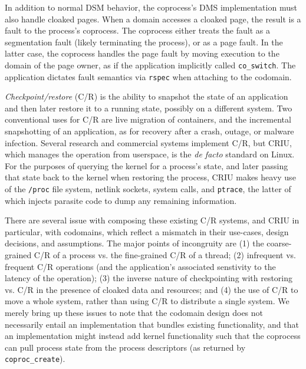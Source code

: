 In addition to normal DSM behavior, the coprocess's DMS implementation must
also handle cloaked pages.
%
When a domain accesses a cloaked page, the result is a fault to the process's
coprocess.
%
The coprocess either treats the fault as a segmentation fault (likely
terminating the process), or as a page fault.
%
In the latter case, the coprocess handles the page fault by moving execution to
the domain of the page owner, as if the application implicitly called
\texttt{co\_switch}.
%
The application dictates fault semantics via \texttt{rspec}
when attaching to the codomain.


%
\emph{Checkpoint/restore} (C/R) is the ability to snapshot the state of an
application and then later restore it to a running state, possibly
on a different system.
%
Two conventional uses for C/R are live migration of containers,
and the incremental snapshotting of an application, as for recovery
after a crash, outage, or malware infection.
%
Several research and commercial systems implement C/R, but CRIU, which manages
the operation from userspace, is the \emph{de facto} standard on Linux.
%
For the purposes of querying the kernel for a process's state, and later
passing that state back to the kernel when restoring the process,
CRIU makes heavy use of the \texttt{/proc} file system, netlink sockets,
system calls, and \texttt{ptrace}, the latter of which injects parasite code
to dump any remaining information.


There are several issue with composing these existing C/R systems, and CRIU in
particular, with codomains, which reflect a mismatch in their use-cases, design
decisions, and assumptions.
%
The major points of incongruity are (1) the coarse-grained C/R of a process vs.
the fine-grained C/R of a thread; (2) infrequent vs. frequent C/R operations
(and the application's associated senstivity to the latency of the operation);
(3) the inverse nature of checkpointing with restoring vs. C/R in the presence
of cloaked data and resources; and (4) the use of C/R to move a whole system,
rather than using C/R to distribute a single system.
%
We merely bring up these issues to note that the codomain design does not
necessarily entail an implementation that bundles existing functionality, and
that an implementation might instead add kernel functionality such that the
coprocess can pull process state from the process descriptors (as returned by
\texttt{coproc\_create}).



